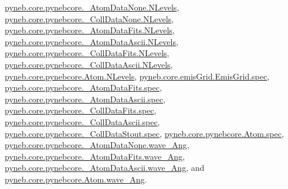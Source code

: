 \hyperlink{pynebcore_8py_source_l00069}{pyneb.\-core.\-pynebcore.\-\_\-\-Atom\-Data\-None.\-N\-Levels}, \hyperlink{pynebcore_8py_source_l00082}{pyneb.\-core.\-pynebcore.\-\_\-\-Coll\-Data\-None.\-N\-Levels}, \hyperlink{pynebcore_8py_source_l00098}{pyneb.\-core.\-pynebcore.\-\_\-\-Atom\-Data\-Fits.\-N\-Levels}, \hyperlink{pynebcore_8py_source_l00319}{pyneb.\-core.\-pynebcore.\-\_\-\-Atom\-Data\-Ascii.\-N\-Levels}, \hyperlink{pynebcore_8py_source_l00586}{pyneb.\-core.\-pynebcore.\-\_\-\-Coll\-Data\-Fits.\-N\-Levels}, \hyperlink{pynebcore_8py_source_l00933}{pyneb.\-core.\-pynebcore.\-\_\-\-Coll\-Data\-Ascii.\-N\-Levels}, \hyperlink{pynebcore_8py_source_l01231}{pyneb.\-core.\-pynebcore.\-Atom.\-N\-Levels}, \hyperlink{emis_grid_8py_source_l00049}{pyneb.\-core.\-emis\-Grid.\-Emis\-Grid.\-spec}, \hyperlink{pynebcore_8py_source_l00091}{pyneb.\-core.\-pynebcore.\-\_\-\-Atom\-Data\-Fits.\-spec}, \hyperlink{pynebcore_8py_source_l00312}{pyneb.\-core.\-pynebcore.\-\_\-\-Atom\-Data\-Ascii.\-spec}, \hyperlink{pynebcore_8py_source_l00578}{pyneb.\-core.\-pynebcore.\-\_\-\-Coll\-Data\-Fits.\-spec}, \hyperlink{pynebcore_8py_source_l00928}{pyneb.\-core.\-pynebcore.\-\_\-\-Coll\-Data\-Ascii.\-spec}, \hyperlink{pynebcore_8py_source_l01164}{pyneb.\-core.\-pynebcore.\-\_\-\-Coll\-Data\-Stout.\-spec}, \hyperlink{pynebcore_8py_source_l01220}{pyneb.\-core.\-pynebcore.\-Atom.\-spec}, \hyperlink{pynebcore_8py_source_l00064}{pyneb.\-core.\-pynebcore.\-\_\-\-Atom\-Data\-None.\-wave\-\_\-\-Ang}, \hyperlink{pynebcore_8py_source_l00172}{pyneb.\-core.\-pynebcore.\-\_\-\-Atom\-Data\-Fits.\-wave\-\_\-\-Ang}, \hyperlink{pynebcore_8py_source_l00438}{pyneb.\-core.\-pynebcore.\-\_\-\-Atom\-Data\-Ascii.\-wave\-\_\-\-Ang}, and \hyperlink{pynebcore_8py_source_l01254}{pyneb.\-core.\-pynebcore.\-Atom.\-wave\-\_\-\-Ang}.


